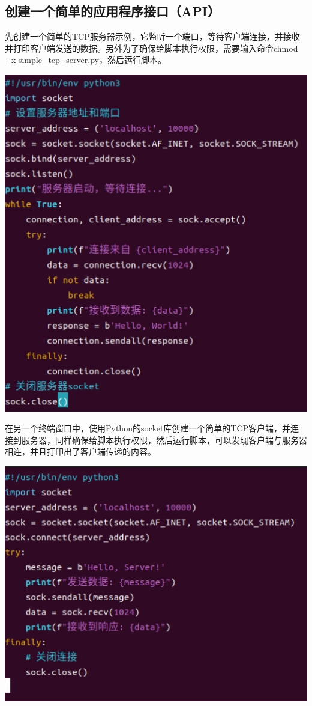 \documentclass[UTF8,a4paper]{ctexart}
\begin{document}
\begin{sloppypar}
	\subsection{创建一个简单的应用程序接口（API）}
	先创建一个简单的TCP服务器示例，它监听一个端口，等待客户端连接，并接收并打印客户端发送的数据。另外为了确保给脚本执行权限，需要输入命令chmod +x simple\_tcp\_server.py，然后运行脚本。
	
	\includegraphics[width = 14cm]{23}
	
	在另一个终端窗口中，使用Python的socket库创建一个简单的TCP客户端，并连接到服务器，同样确保给脚本执行权限，然后运行脚本，可以发现客户端与服务器相连，并且打印出了客户端传递的内容。
	
	\includegraphics[width = 14cm]{24}
	

\end{sloppypar}
\end{document}
